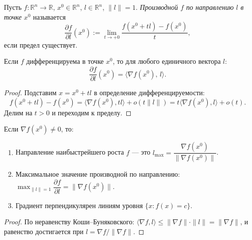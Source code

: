 



\begin{defn}
  Пусть $f: \mathbb{R}^n \to \mathbb{R}$, $x^0 \in \mathbb{R}^n$, $l \in \mathbb{R}^n$, $\|l\| = 1$.
  \emph{Производной $f$ по направлению $l$ в точке $x^0$} называется
  \[
    \frac{\partial f}{\partial l}(x^0) := \lim_{t \to +0} \frac{f(x^0 + tl) - f(x^0)}{t},
  \]
  если предел существует.
\end{defn}

\begin{theorem}
  Если $f$ дифференцируема в точке $x^0$, то для любого единичного вектора $l$:
  \[
    \frac{\partial f}{\partial l}(x^0) = \langle \nabla f(x^0),\, l \rangle.
  \]
  \begin{proof}
    Подставим $x = x^0 + tl$ в определение дифференцируемости:
    \[
      f(x^0+tl) - f(x^0) = \langle \nabla f(x^0), tl \rangle + o(t\|l\|)
      = t\langle \nabla f(x^0), l \rangle + o(t).
    \]
    Делим на $t > 0$ и переходим к пределу. \qedhere
  \end{proof}
\end{theorem}

\begin{theorem}
  Если $\nabla f(x^0) \neq 0$, то:
  \begin{enumerate}
    \item Направление наибыстрейшего роста $f$ --- это $l_{\max} = \dfrac{\nabla f(x^0)}{\|\nabla f(x^0)\|}$.
    \item Максимальное значение производной по направлению: $\max_{\|l\|=1} \dfrac{\partial f}{\partial l} = \|\nabla f(x^0)\|$.
    \item Градиент перпендикулярен линиям уровня $\{x: f(x) = c\}$.
  \end{enumerate}
  \begin{proof}
    По неравенству Коши--Буняковского:
    $\langle \nabla f, l \rangle \leq \|\nabla f\|\cdot\|l\| = \|\nabla f\|$,
    и равенство достигается при $l = \nabla f/\|\nabla f\|$. \qedhere
  \end{proof}
\end{theorem}

